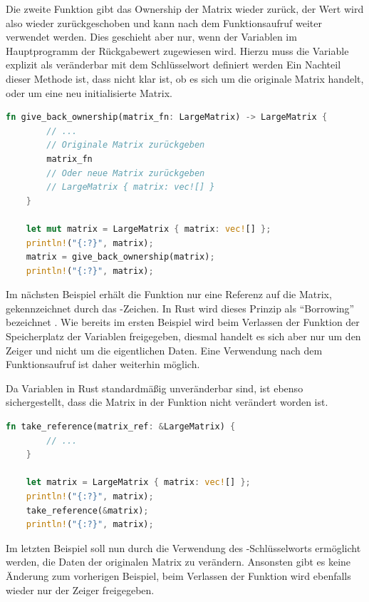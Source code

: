 \documentclass[11pt,a4paper, ngerman]{article}
\begin{document}
Die zweite Funktion gibt das Ownership der Matrix wieder zurück, der Wert wird also wieder zurückgeschoben und kann nach dem Funktionsaufruf weiter verwendet werden. Dies geschieht aber nur, wenn der Variablen im Hauptprogramm der Rückgabewert zugewiesen wird. Hierzu muss die Variable  explizit als veränderbar mit dem Schlüsselwort  definiert werden Ein Nachteil dieser Methode ist, dass nicht klar ist, ob es sich um die originale Matrix handelt, oder um eine neu initialisierte Matrix.

\begin{lstlisting}[language=rust, caption={Einführendes Beispiel: Ownership zurückgeben}]
    fn give_back_ownership(matrix_fn: LargeMatrix) -> LargeMatrix {
        // ...
        // Originale Matrix zurückgeben
        matrix_fn
        // Oder neue Matrix zurückgeben
        // LargeMatrix { matrix: vec![] }
    }

    let mut matrix = LargeMatrix { matrix: vec![] };
    println!("{:?}", matrix);
    matrix = give_back_ownership(matrix);
    println!("{:?}", matrix);
\end{lstlisting}

Im nächsten Beispiel erhält die Funktion nur eine Referenz auf die Matrix, gekennzeichnet durch das \codeword{&}-Zeichen. In Rust wird dieses Prinzip als ``Borrowing'' bezeichnet \cite{RustBorrowing}. Wie bereits im ersten Beispiel wird beim Verlassen der Funktion der Speicherplatz der Variablen freigegeben, diesmal handelt es sich aber nur um den Zeiger und nicht um die eigentlichen Daten. Eine Verwendung nach dem Funktionsaufruf ist daher weiterhin möglich.

Da Variablen in Rust standardmäßig unveränderbar sind, ist ebenso sichergestellt, dass die Matrix in der Funktion nicht verändert worden ist. 

\begin{lstlisting}[language=rust, caption={Einführendes Beispiel: Unveränderliche Referenz}]
    fn take_reference(matrix_ref: &LargeMatrix) {
        // ...
    }

    let matrix = LargeMatrix { matrix: vec![] };
    println!("{:?}", matrix);
    take_reference(&matrix);
    println!("{:?}", matrix);
\end{lstlisting}

Im letzten Beispiel soll nun durch die Verwendung des -Schlüsselworts ermöglicht werden, die Daten der originalen Matrix zu verändern. Ansonsten gibt es keine Änderung zum vorherigen Beispiel, beim Verlassen der Funktion wird ebenfalls wieder nur der Zeiger freigegeben.
\end{document}
